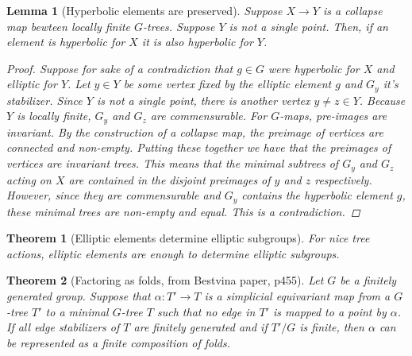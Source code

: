 \documentclass{article}
\theoremstyle{mystyle}
\newtheorem{thm}{Theorem}[section]
\newtheorem{lem}{Lemma}[section]
\theoremstyle{remark}
\begin{document}
\begin{lem}
    [Hyperbolic elements are preserved]
    \label{lem:promoteelliptic} 
    Suppose \(X \to Y\) is a collapse map bewteen locally finite \(G\)-trees. Suppose \(Y\) is not a single point. Then, if an element is hyperbolic for \(X\) it is also hyperbolic for \(Y\).
    \begin{proof}
        Suppose for sake of a contradiction that \(g\in G\) were hyperbolic for \(X\) and elliptic for \(Y\). Let \(y \in Y\) be some vertex fixed by the elliptic element \(g\) and \(G_y\) it's stabilizer. Since \(Y\) is not a single point, there is another vertex \(y\neq z \in Y\). Because \(Y\) is locally finite, \(G_y\) and \(G_z\) are commensurable. For \(G\)-maps, pre-images are invariant. By the construction of a collapse map, the preimage of vertices are connected and non-empty. Putting these together we have that the preimages of vertices are invariant trees. This means that the minimal subtrees of \(G_y\) and \(G_z\) acting on \(X\) are contained in the disjoint preimages of \(y\) and \(z\) respectively. However, since they are commensurable and \(G_y\) contains the hyperbolic element \(g\), these minimal trees are non-empty and equal. This is a contradiction.
    \end{proof}
\end{lem}

\begin{thm}
    [Elliptic elements determine elliptic subgroups]
    \label{thm:ellelesubgroups} 
    For nice tree actions, elliptic elements are enough to determine elliptic subgroups.
    
\end{thm}

\begin{thm}[Factoring as folds, from Bestvina paper, p455]
    \label{thm:folds} 
Let $G$ be a finitely generated group. Suppose that $\alpha: T'\to T$ is a simplicial equivariant map from a $G$-tree $T'$ to a minimal $G$-tree $T$ such that no edge in $T'$ is mapped to a point by $\alpha$. If all edge stabilizers of $T$ are finitely generated and if $T'/G$ is finite, then $\alpha$ can be represented as a finite composition of folds.
\end{thm}
\end{document}

